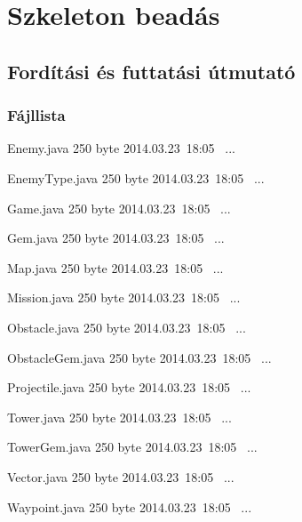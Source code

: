 %
\chapter{Szkeleton beadás}

\thispagestyle{fancy}

\section{Fordítási és futtatási útmutató}

\subsection{Fájllista}

\begin{fajllista}

\fajl
{Enemy.java} %
{250 byte} %
{2014.03.23~18:05~}
{...} %

\fajl
{EnemyType.java} %
{250 byte} %
{2014.03.23~18:05~}
{...} %

\fajl
{Game.java} %
{250 byte} %
{2014.03.23~18:05~}
{...} %

\fajl
{Gem.java} %
{250 byte} %
{2014.03.23~18:05~}
{...} %

\fajl
{Map.java} %
{250 byte} %
{2014.03.23~18:05~}
{...} %

\fajl
{Mission.java} %
{250 byte} %
{2014.03.23~18:05~}
{...} %

\fajl
{Obstacle.java} %
{250 byte} %
{2014.03.23~18:05~}
{...} %

\fajl
{ObstacleGem.java} %
{250 byte} %
{2014.03.23~18:05~}
{...} %

\fajl
{Projectile.java} %
{250 byte} %
{2014.03.23~18:05~}
{...} %

\fajl
{Tower.java} %
{250 byte} %
{2014.03.23~18:05~}
{...} %

\fajl
{TowerGem.java} %
{250 byte} %
{2014.03.23~18:05~}
{...} %

\fajl
{Vector.java} %
{250 byte} %
{2014.03.23~18:05~}
{...} %

\fajl
{Waypoint.java} %
{250 byte} %
{2014.03.23~18:05~}
{...} %

\end{fajllista}

